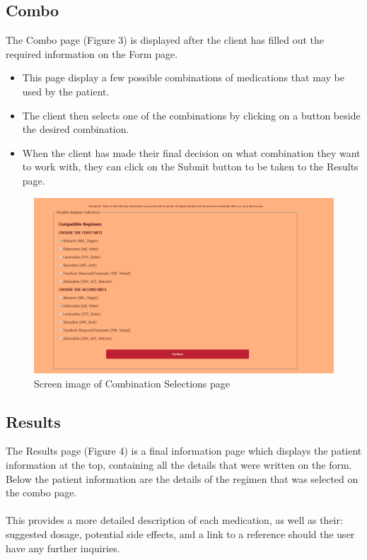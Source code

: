 \documentclass[12pt]{article}
\begin{document}
\subsection{Combo}
The Combo page (Figure 3) is displayed after the client has filled out the required information on the Form page. 
\begin{itemize}
	\item This page display a few possible combinations of medications that may be used by the patient.
	\item  The client then selects one of the combinations by clicking on a button beside the desired combination.
	\item When the client has made their final decision on what combination they want to work with, they can click on the Submit button to be taken to the Results page.
\end{itemize}

\begin{figure}[H]
  \centering
  \includegraphics[width=\linewidth]{combo.png}
  \caption{Screen image of Combination Selections page}
  \label{fig:combo}
\end{figure}

\subsection{Results}
The Results page (Figure 4) is a final information page which displays the patient information at the top, containing all the details that were written on the form. Below the patient information are the details of the regimen that was selected on the combo page.\\\\ This provides a more detailed description of each medication, as well as their: suggested dosage, potential side effects, and a link to a reference should the user have any further inquiries.
\end{document}
